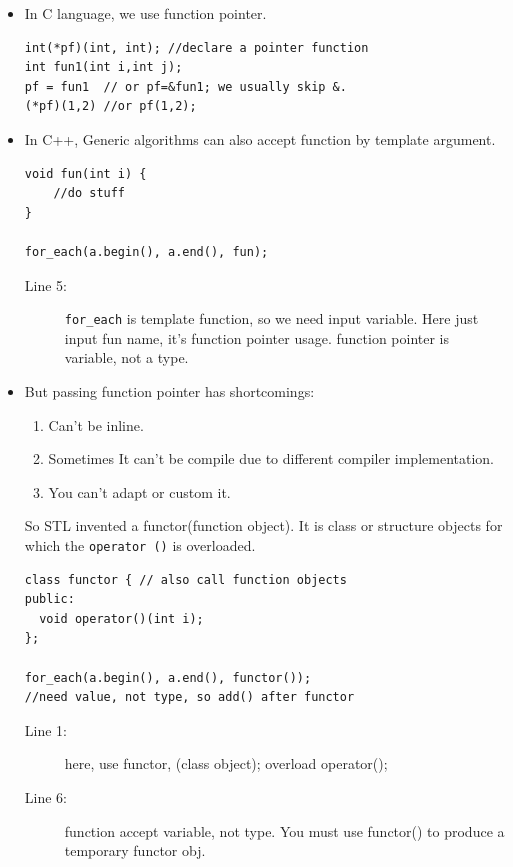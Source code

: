 \documentclass[a4paper,11pt,twoside]{book}
\begin{document}
\begin{itemize}



\item  In C language, we use function pointer.
\begin{lstlisting}[numbers=none]
int(*pf)(int, int); //declare a pointer function
int fun1(int i,int j);
pf = fun1  // or pf=&fun1; we usually skip &.
(*pf)(1,2) //or pf(1,2);
\end{lstlisting}

\item In C++, Generic algorithms can also accept function by template argument.
\begin{lstlisting}[numbers=none]
void fun(int i) {
	//do stuff
}

for_each(a.begin(), a.end(), fun);
\end{lstlisting}
\begin{description}
	\item[Line 5:] \texttt{for\_each} is template function, so we need input variable. Here just input fun name, it's function pointer usage. function pointer is variable, not a type.
\end{description}

\item But passing function pointer has shortcomings:
\begin{enumerate}
	\item Can't be inline.
	\item Sometimes It can't be compile due to different compiler implementation.
	\item You can't adapt or custom it.
\end{enumerate}
So STL invented a functor(function object). It is class or structure objects for which the \texttt{operator ()} is overloaded.

\begin{lstlisting}
class functor { // also call function objects
public:
  void operator()(int i);
};

for_each(a.begin(), a.end(), functor()); 
//need value, not type, so add() after functor
\end{lstlisting}
\begin{description}
	\item[Line 1:] here, use functor, (class object); overload operator();
	\item[Line 6:] function accept variable, not type. You must use functor() to produce a temporary functor obj.
\end{description}


\end{itemize}
\end{document}
